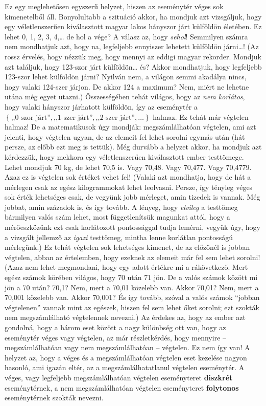 \documentclass[magyar,]{book}
\begin{document}
Ez egy meglehetősen egyszerű helyzet, hiszen az eseménytér véges sok kimenetelből áll. Bonyolultabb a szituáció akkor, ha mondjuk azt vizsgáljuk, hogy egy véletlenszerűen kiválasztott magyar lakos hányszor járt külföldön életében. Ez lehet 0, 1, 2, 3, 4,\ldots{} de hol a vége? A válasz az, hogy \emph{sehol}! Semmilyen számra nem mondhatjuk azt, hogy na, legfeljebb ennyiszer lehetett külföldön járni\ldots! (Az rossz érvelés, hogy nézzük meg, hogy mennyi az eddigi magyar rekorder. Mondjuk azt találjuk, hogy 123-szor járt külföldön\ldots{} és? Akkor mondhatjuk, hogy legfeljebb 123-szor lehet külföldön járni? Nyilván nem, a világon semmi akadálya nincs, hogy valaki 124-szer járjon. De akkor 124 a maximum? Nem, miért ne lehetne utána még egyet utazni.) Összességében tehát világos, hogy az \emph{nem korlátos}, hogy valaki hányszor járhatott külföldön, így az eseménytér a \(\left\{\text{,,0-szor járt''},\text{,,1-szer járt''}, \text{,,2-szer járt''},\dots{}\right\}\) halmaz. Ez tehát már végtelen halmaz! De a matematikusok úgy mondják: megszámlálhatóan végtelen, ami azt jelenti, hogy végtelen ugyan, de az elemeit fel lehet sorolni egymás után (hát persze, az előbb ezt meg is tettük). Még durvább a helyzet akkor, ha mondjuk azt kérdezzük, hogy mekkora egy véletlenszerűen kiválasztott ember testtömege. Lehet mondjuk 70 kg, de lehet 70,5 is. Vagy 70,48. Vagy 70,477. Vagy 70,4779. Azaz ez is végtelen sok értéket vehet fel! (Valaki azt mondhatja, hogy de hát a mérlegen csak az egész kilogrammokat lehet leolvasni. Persze, így tényleg véges sok érték lehetséges csak, de vegyünk jobb mérleget, amin tizedek is vannak. Még jobbat, amin századok is, és így tovább. A lényeg, hogy \emph{elvileg} a testtömeg bármilyen valós szám lehet, most függetlenítsük magunkat attól, hogy a mérőeszközünk ezt csak korlátozott pontossággal tudja lemérni, vegyük úgy, hogy a vizsgált jellemző az \emph{igazi} testtömeg, mintha lenne korlátlan pontosságú mérlegünk.) Ez tehát végtelen sok lehetséges kimenet, de az előzőnél is jobban végtelen, abban az értelemben, hogy ezeknek az elemeit már fel sem lehet sorolni! (Azaz nem lehet megmondani, hogy egy adott értékre mi a rákövetkező. Mert egész számok körében világos, hogy 70 után 71 jön. De a valós számok között mi jön a 70 után? 70,1? Nem, mert a 70,01 közelebb van. Akkor 70,01? Nem, mert a 70,001 közelebb van. Akkor 70,001? És így tovább, szóval a valós számok \enquote{jobban végtelenen} vannak mint az egészek, hiszen fel sem lehet őket sorolni; ezt szokták nem megszámlálható végtelennek nevezni.) Az érdekes az, hogy az ember azt gondolná, hogy a három eset között a nagy különbség ott van, hogy az eseménytér véges vagy végtelen, az már részletkérdés, hogy mennyire -- megszámlálhatóan vagy nem megszámlálhatóan -- végtelen. Ez nem így van! A helyzet az, hogy a véges és a megszámlálhatóan végtelen eset kezelése nagyon hasonló, ami igazán eltér, az a megszámlálhatatlanul végtelen eseménytér. A véges, vagy legfeljebb megszámlálhatóan végtelen eseményteret \textbf{diszkrét} eseménytérnek, a nem megszámlálhatóan végtelen eseményteret \textbf{folytonos} eseménytérnek szokták nevezni.
\end{document}
